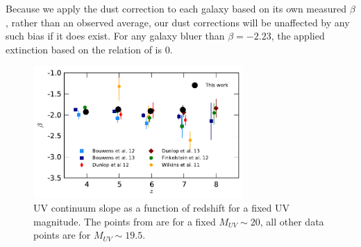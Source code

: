 Because we apply the dust correction to each galaxy based on its own measured $\beta$, rather than an observed average, our dust corrections will be unaffected by any such bias if it does exist. For any galaxy bluer than $\beta = -2.23$, the applied extinction based on the relation of \citet{Meurer:1999jm} is 0.

\begin{figure}
\centering
\includegraphics[width=80mm]{plots/figB3.pdf}
\caption[Short caption]{UV continuum slope as a function of redshift for a fixed UV magnitude. The points from \citep{2012ApJ...756..164F} are for a fixed $M_{UV} \sim 20$, all other data points are for $M_{UV} \sim 19.5$.}
\label{fig:beta_z}
\end{figure}



